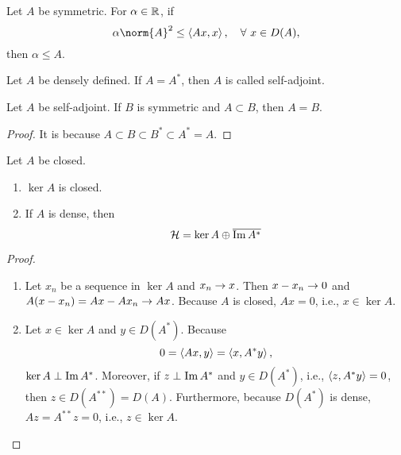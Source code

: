 \documentclass[a4paper,12pt]{article}
\begin{document}
\begin{defn}[Order]
    Let $A$ be symmetric. For $\alpha \in \mathbb{R}$, if
    \begin{equation*}
        \alpha \norm{A}^2 \leq \inn{Ax,x},\quad \forall~x \in D(A),
    \end{equation*}
    then $\alpha \leq A$.
\end{defn}

\begin{defn}
    Let $A$ be densely defined. If $A = A^*$, then $A$ is called self-adjoint.
\end{defn}

\begin{prop}
    Let $A$ be self-adjoint. If $B$ is symmetric and $A \subset B$, then $A = B$.
\end{prop}
\begin{proof}
    It is because $A \subset B \subset B^* \subset A^* = A$.
\end{proof}

\begin{prop}
    Let $A$ be closed.
    \begin{enumerate}[label=(\arabic{*})]
        \item $\ker A$ is closed.
        \item If $A$ is dense, then
        \begin{equation*}
            \mathcal{H} = \ker A \oplus \overline{\operatorname{Im} A^*}
        \end{equation*}
    \end{enumerate}
\end{prop}
\begin{proof}
    \begin{enumerate}[label=(\arabic{*})]
        \item Let $x_n$ be a sequence in $\ker A$ and $x_n \rightarrow x$. Then $x - x_n \rightarrow 0$ and $A(x - x_n) = Ax - Ax_n \rightarrow Ax$. Because $A$ is closed, $Ax = 0$, i.e., $x \in \ker A$.

        \item Let $x \in  \ker A$ and $y \in D(A^*)$. Because
        \begin{equation*}
            0 = \left\langle Ax,y \right\rangle = \left\langle x,A^*y \right\rangle,
        \end{equation*}
        $\ker A \perp \operatorname{Im} A^*$. Moreover, if $z \perp \operatorname{Im} A^*$ and $y \in D(A^*)$, i.e., $\left\langle z,A^*y \right\rangle = 0$, then $z \in D(A^{**}) = D(A)$. Furthermore, because $D(A^*)$ is dense, $Az = A^{**}z = 0$, i.e., $z \in \ker A$. \qedhere
    \end{enumerate}
\end{proof}
\end{document}

